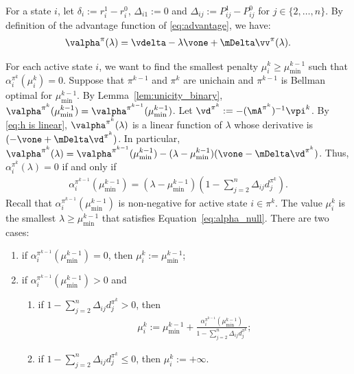 For a state $i$, let $\delta_i:=r^1_i - r^0_i$, $\Delta_{i1}:=0$ and $\Delta_{ij}:=P^1_{ij}-P^0_{ij}$ for $j\in\{2,\dots, n\}$. By definition of the advantage function of \eqref{eq:advantage}, we have: 
\begin{align*}
    \valpha^\pi(\lambda)=\vdelta -\lambda\vone +\mDelta\vv^\pi(\lambda).
\end{align*}

For each active state $i$, we want to find the smallest penalty $\mu^k_i\ge\mu^{k-1}_{\min}$ such that $\alpha^{\pi^k}_i(\mu^k_i)=0$.
Suppose that $\pi^{k-1}$ and $\pi^k$ are unichain and $\pi^{k-1}$ is Bellman optimal for $\mu^{k-1}_{\min}$.
By Lemma~\ref{lem:unicity_binary}, $\valpha^{\pi^k}(\mu^{k-1}_{\min})= \valpha^{\pi^{k-1}}(\mu^{k-1}_{\min})$.
Let $\vd^{\pi^k}:=-(\mA^{\pi^k})^{-1}{\vpi^k}$.
By \eqref{eq:h is linear}, $\valpha^{\pi^k}(\lambda)$ is a linear function of $\lambda$ whose derivative is $(-\vone+\mDelta\vd^{\pi^k})$.
In particular, $\valpha^{\pi^k}(\lambda)=\valpha^{\pi^{k-1}}(\mu^{k-1}_{\min}) -(\lambda-\mu^{k-1}_{\min})(\vone -\mDelta\vd^{\pi^k})$.
Thus, $\alpha^{\pi^k}_i(\lambda)=0$ if and only if
\begin{align}
    \label{eq:alpha_null}
    \alpha^{\pi^{k-1}}_i(\mu^{k-1}_{\min}) = (\lambda -\mu^{k-1}_{\min})(1 -\sum_{j=2}^n\Delta_{ij} d_j^{\pi^k}).
\end{align}
Recall that $\alpha^{\pi^{k-1}}_i(\mu^{k-1}_{\min})$ is non-negative for active state $i\in\pi^k$. The value $\mu^k_i$ is the smallest $\lambda\ge\mu^{k-1}_{\min}$ that satisfies Equation~\eqref{eq:alpha_null}. There are two cases: 
\begin{enumerate}
    \item if $\alpha^{\pi^{k-1}}_i(\mu^{k-1}_{\min})=0$, then $\mu^k_i:=\mu^{k-1}_{\min}$;
    \item if $\alpha^{\pi^{k-1}}_i(\mu^{k-1}_{\min})>0$ and
        \begin{enumerate}
            \item if $1 -\sum_{j=2}^n\Delta_{ij} d_j^{\pi^k}>0$, then
            \begin{align}
                \label{eq:mu_i_k_from_d}
                \mu^k_i:=\mu^{k-1}_{\min} +\frac{ \alpha^{\pi^{k-1}}_i(\mu^{k-1}_{\min})}{1 -\sum_{j=2}^n\Delta_{ij} d_j^{\pi^k}};
            \end{align}
            \item if $1 -\sum_{j=2}^n\Delta_{ij} d_j^{\pi^k}\le0$, then $\mu^k_i:=+\infty$.
        \end{enumerate}
\end{enumerate}


